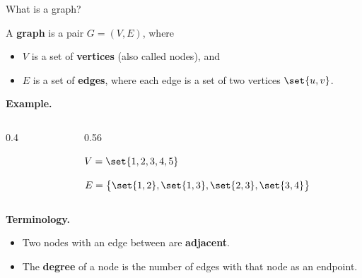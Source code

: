 \documentclass[10pt]{beamer}
\begin{document}


\begin{frame}{What is a graph?}

\begin{mygreenbox}[title=\text{Definition: Graph}]
A \textbf{graph} is a pair $G = (V, E)$, where
\begin{itemize}
\item $V$ is a set of \textbf{vertices} (also called nodes), and
\item $E$ is a set of \textbf{edges}, where each edge is a set of two vertices $\set{u, v}$.
\end{itemize}
\end{mygreenbox}

\vfill

\colorbox{yellow!30}{\textbf{Example.}}

\begin{columns}[c,onlytextwidth]
\begin{column}{0.4\textwidth}
\centering
{}
\end{column}
\begin{column}{0.56\textwidth}

$V = \set{1, 2, 3, 4, 5}$

\vspace{8pt}
$E = \big\{ \set{1,2}, \set{1,3}, \set{2,3}, \set{3,4} \big\}$

\vspace{8pt}
\end{column}
\end{columns}

\pause 
\scriptsize 
\colorbox{red!30}{\textbf{Terminology.}}
\begin{itemize}
\item Two nodes with an edge between are \textbf{adjacent}. \pause 
\item The \textbf{degree} of a node is the number of edges with that node as an endpoint.
\end{itemize}




\vfill
\end{frame}
\end{document}
